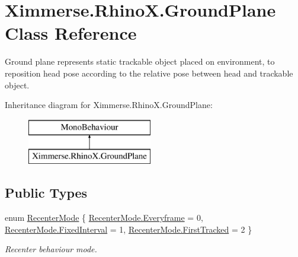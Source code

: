 \hypertarget{class_ximmerse_1_1_rhino_x_1_1_ground_plane}{}\section{Ximmerse.\+Rhino\+X.\+Ground\+Plane Class Reference}
\label{class_ximmerse_1_1_rhino_x_1_1_ground_plane}


Ground plane represents static trackable object placed on environment, to reposition head pose according to the relative pose between head and trackable object.  


Inheritance diagram for Ximmerse.\+Rhino\+X.\+Ground\+Plane\+:\begin{figure}[H]
\begin{center}
\leavevmode
\includegraphics[height=2.000000cm]{class_ximmerse_1_1_rhino_x_1_1_ground_plane}
\end{center}
\end{figure}
\subsection*{Public Types}
\begin{DoxyCompactItemize}
\item 
enum \mbox{\hyperlink{class_ximmerse_1_1_rhino_x_1_1_ground_plane_a8813fd8673b953d9d9eb5e87b16cad14}{Recenter\+Mode}} \{ \mbox{\hyperlink{class_ximmerse_1_1_rhino_x_1_1_ground_plane_a8813fd8673b953d9d9eb5e87b16cad14ae7052705ca5b1918757966609990e511}{Recenter\+Mode.\+Everyframe}} = 0, 
\mbox{\hyperlink{class_ximmerse_1_1_rhino_x_1_1_ground_plane_a8813fd8673b953d9d9eb5e87b16cad14a8fcbeb1464e18e07dc95e57674102532}{Recenter\+Mode.\+Fixed\+Interval}} = 1, 
\mbox{\hyperlink{class_ximmerse_1_1_rhino_x_1_1_ground_plane_a8813fd8673b953d9d9eb5e87b16cad14a7aa380179987cdf970ad4a8ac6d81d46}{Recenter\+Mode.\+First\+Tracked}} = 2
 \}
\begin{DoxyCompactList}\small\item\em Recenter behaviour mode. \end{DoxyCompactList}\end{DoxyCompactItemize}
